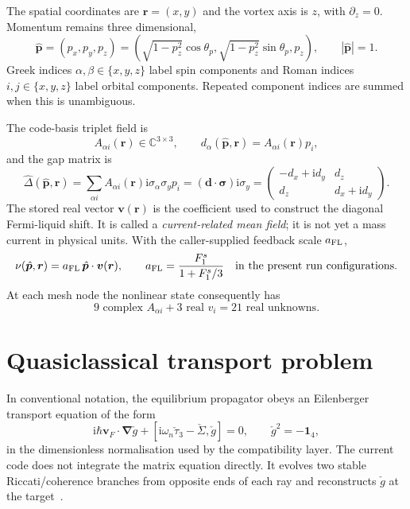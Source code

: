 \documentclass[11pt,a4paper]{article}
\newcommand{\ii}{\mathrm{i}}
\newcommand{\oneNambu}{\mathbf{1}_{4}}
\newcommand{\phat}{\hat{\bm p}}
\begin{document}
The spatial coordinates are $\bm r=(x,y)$ and the vortex axis is $z$, with
$\partial_z=0$.  Momentum remains three dimensional,
\begin{equation}
  \phat=(p_x,p_y,p_z)
  =\left(\sqrt{1-p_z^2}\cos\theta_p,
         \sqrt{1-p_z^2}\sin\theta_p,p_z\right),
  \qquad |\phat|=1 .
  \label{eq:momentum}
\end{equation}
Greek indices $\alpha,\beta\in\{x,y,z\}$ label spin components and Roman
indices $i,j\in\{x,y,z\}$ label orbital components.  Repeated component
indices are summed when this is unambiguous.

The code-basis triplet field is
\begin{equation}
  A_{\alpha i}(\bm r)\in\mathbb{C}^{3\times3},
  \qquad
  d_\alpha(\phat,\bm r)=A_{\alpha i}(\bm r)p_i,
  \label{eq:dvector}
\end{equation}
and the gap matrix is
\begin{equation}
  \widehat\Delta(\phat,\bm r)
  =\sum_{\alpha i}A_{\alpha i}(\bm r)
       \ii\sigma_\alpha\sigma_y p_i
  =(\bm d\cdot\bm\sigma)\ii\sigma_y
  =\begin{pmatrix}
     -d_x+\ii d_y & d_z\\ d_z & d_x+\ii d_y
   \end{pmatrix}.
  \label{eq:gapmatrix}
\end{equation}
The stored real vector $\bm v(\bm r)$ is the coefficient used to construct
the diagonal Fermi-liquid shift.  It is called a
\emph{current-related mean field}; it is not yet a mass current in physical
units.  With the caller-supplied feedback scale $a_{\rm FL}$,
\begin{equation}
  \nu(\phat,\bm r)=a_{\rm FL}\,\phat\cdot\bm v(\bm r),
  \qquad
  a_{\rm FL}=\frac{F_1^s}{1+F_1^s/3}
  \quad\text{in the present run configurations}.
  \label{eq:diagonalshift}
\end{equation}
At each mesh node the nonlinear state consequently has
\begin{equation}
  9\text{ complex }A_{\alpha i}+3\text{ real }v_i=21\text{ real unknowns}.
  \label{eq:statecount}
\end{equation}

\section{Quasiclassical transport problem}

In conventional notation, the equilibrium propagator obeys an Eilenberger
transport equation of the form
\begin{equation}
  \ii\hbar\bm v_F\cdot\bm\nabla\check g
  +[\ii\omega_n\check\tau_3-\check\Sigma,\check g]=0,
  \qquad \check g^2=-\oneNambu,
  \label{eq:eilenberger}
\end{equation}
in the dimensionless normalisation used by the compatibility layer.  The
current code does not integrate the matrix equation directly.  It evolves two
stable Riccati/coherence branches from opposite ends of each ray and
reconstructs $\check g$ at the target~\cite{eschrig2000}.
\end{document}
